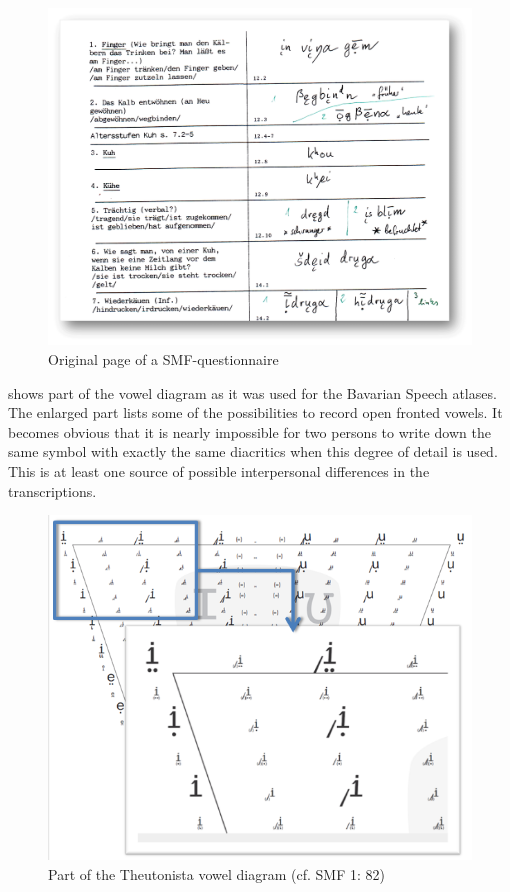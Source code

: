 \documentclass[output=paper]{LSP/langsci}
\begin{document}
\begin{figure}[t]
\includegraphics[width=\textwidth]{illustrations/mathus_fig3}
\caption{Original page of a SMF-questionnaire}
\label{fig:mathus:3}
\end{figure}

 shows part of the vowel diagram as it was used for the Bavarian Speech atlases. The enlarged part lists some of the possibilities to record open fronted vowels. It becomes obvious that it is nearly impossible for two persons to write down the same symbol with exactly the same diacritics when this degree of detail is used. This is at least one source of possible interpersonal differences in the transcriptions.

\begin{figure}[t]
\includegraphics[width=\textwidth]{illustrations/mathus_fig4}
\caption{Part of the Theutonista vowel diagram (cf. SMF 1: 82)}
\label{fig:mathus:4}
\end{figure}
\end{document}
